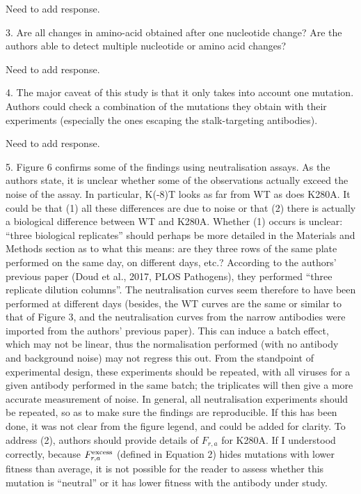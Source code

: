 \documentclass[11pt, oneside]{article}   	%
\begin{document}
{\color{red}
Need to add response.}

3. Are all changes in amino-acid obtained after one nucleotide change? Are the authors able to detect multiple nucleotide or amino acid changes?

{\color{red}
Need to add response.}

4. The major caveat of this study is that it only takes into account one mutation. Authors could check a combination of the mutations they obtain with their experiments (especially the ones escaping the stalk-targeting antibodies).

{\color{red}
Need to add response.}

5. Figure 6 confirms some of the findings using neutralisation assays. As the authors state, it is unclear whether some of the observations actually exceed the noise of the assay. In particular, K(-8)T looks as far from WT as does K280A. It could be that (1) all these differences are due to noise or that (2) there is actually a biological difference between WT and K280A. Whether (1) occurs is unclear: ``three biological replicates'' should perhaps be more detailed in the Materials and Methods section as to what this means: are they three rows of the same plate performed on the same day, on different days, etc.? According to the authors' previous paper (Doud et al., 2017, PLOS Pathogens), they performed ``three replicate dilution columns''. The neutralisation curves seem therefore to have been performed at different days (besides, the WT curves are the same or similar to that of Figure 3, and the neutralisation curves from the narrow antibodies were imported from the authors' previous paper). This can induce a batch effect, which may not be linear, thus the normalisation performed (with no antibody and background noise) may not regress this out. From the standpoint of experimental design, these experiments should be repeated, with all viruses for a given antibody performed in the same batch; the triplicates will then give a more accurate measurement of noise. In general, all neutralisation experiments should be repeated, so as to make sure the findings are reproducible. If this has been done, it was not clear from the figure legend, and could be added for clarity. To address (2), authors should provide details of $F_{r,a}$ for K280A. If I understood correctly, because $F_{r,a}^{\rm{excess}}$ (defined in Equation 2) hides mutations with lower fitness than average, it is not possible for the reader to assess whether this mutation is ``neutral'' or it has lower fitness with the antibody under study. 
\end{document}

